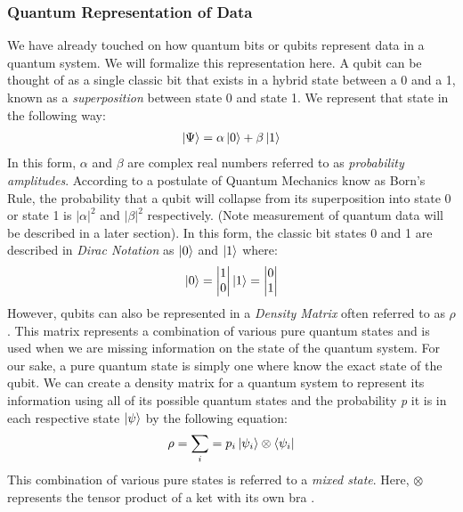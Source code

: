 \documentclass[conference]{IEEEtran}
\begin{document}
\subsubsection{Quantum Representation of Data}
We have already touched on how quantum bits or qubits represent data in a quantum system. We will formalize this representation here. A qubit can be thought of as a single classic bit that exists in a hybrid state between a 0 and a 1, known as a \emph{superposition} between state 0 and state 1. We represent that state in the following way:
\begin{align*}
\ket{\Psi} = \alpha\ket{0} + \beta\ket{1}
\end{align*}
In this form, $\alpha$ and $\beta$ are complex real numbers referred to as \emph{probability amplitudes}. According to a postulate of Quantum Mechanics know as Born's Rule, the probability that a qubit will collapse from its superposition into state 0 or state 1 is $|\alpha|^2$ and $|\beta|^2$ respectively. (Note measurement of quantum data will be described in a later section). In this form, the classic bit states 0 and 1 are described in \emph{Dirac Notation} as $\ket{0}$ and $\ket{1}$ where:
\begin{align*}
\ket{0}=\begin{vmatrix}
1\\
0\\
\end{vmatrix}
\ket{1}=\begin{vmatrix}
0\\
1\\
\end{vmatrix}
\end{align*}
\indent However, qubits can also be represented in a \emph{Density Matrix} often referred to as $\rho$. This matrix represents a combination of various pure quantum states and is used when we are missing information on the state of the quantum system. For our sake, a pure quantum state is simply one where know the exact state of the qubit. We can create a density matrix for a quantum system to represent its information using all of its possible quantum states and the probability \emph{p} it is in each respective state \emph{$\ket{\psi}$} by the following equation: 
\begin{align*}
\rho = \sum_{i}  = p_i \ket{\psi_i} \otimes \bra{\psi_i}
\end{align*}
This combination of various pure states is referred to a \emph{mixed state}. Here, $\otimes$ represents the tensor product of a ket with its own bra \cite{b9}.
\end{document}
